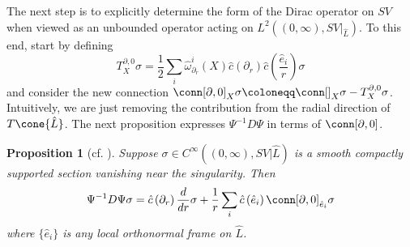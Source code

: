 \documentclass[12pt, reqno]{amsart}
\theoremstyle{plain} %
\newtheorem{proposition}[theorem]{Proposition}
\theoremstyle{definition}
\theoremstyle{remark}
\numberwithin{equation}{section}
\newcommand{\dom}[1]{\hat{#1}}
\newcommand{\cbar}[1]{\dom{c}\left(#1\right)}
\begin{document}
The next step is to explicitly determine the form of the Dirac operator on \(SV\) when viewed as an unbounded operator acting on \(L^2((0, \infty), SV|_{\dom{L}})\).
To this end, start by defining
\begin{equation*}
    T_X^{\partial, 0} \sigma = \frac{1}{2} \sum_i \dom{\omega}_{\partial_r}^i(X) \cbar{\partial_r} \cbar{\frac{\dom{e}_i}{r}} \sigma
\end{equation*}
and consider the new connection \(\conn[\partial, 0]_X \sigma \coloneqq \conn[]_X \sigma - T_X^{\partial, 0} \sigma\).
Intuitively, we are just removing the contribution from the radial direction of \(T\cone{\dom{L}}\).
The next proposition expresses \(\Psi^{-1} D \Psi\) in terms of \(\conn[\partial,0]\).
\begin{proposition}[cf. {\cite[Proposition 5.2]{Lesch:1993}}]\label{prop:dirac operator under unitary transformation}
    Suppose \(\sigma \in C^\infty((0, \infty), SV|{\dom{L}})\) is a smooth compactly supported section vanishing near the singularity.
    Then
    \begin{equation*}
        \Psi^{-1}D\Psi \sigma = \cbar{\partial_r} \frac{d}{dr} \sigma + \frac{1}{r} \sum_i \cbar{\dom{e}_i} \conn[\partial, 0]_{\dom{e}_i} \sigma
    \end{equation*}
    where \(\{\dom{e}_i\}\) is any local orthonormal frame on \(\dom{L}\).
\end{proposition}
\end{document}

